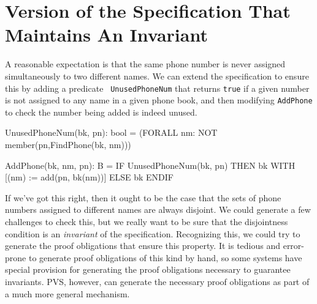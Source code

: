
\section{Version of the Specification That Maintains An Invariant}


A reasonable expectation is that the same phone number is never
assigned simultaneously to two different names.  We can extend the
specification to ensure this by adding a predicate {\tt
UnusedPhoneNum} that returns {\tt true} if a given number is not
assigned to any name in a given phone book, and  then modifying
{\tt AddPhone} to check the  number being added is indeed unused.
\begin{pvsexample}
UnusedPhoneNum(bk, pn): bool =
   (FORALL nm: NOT member(pn,FindPhone(bk, nm)))

AddPhone(bk, nm, pn): B = 
  IF UnusedPhoneNum(bk, pn) THEN bk WITH [(nm) := add(pn, bk(nm))]
    ELSE bk
  ENDIF
\end{pvsexample}

If we've got this right, then it ought to be the case that the sets of
phone numbers assigned to different names are always disjoint.  We
could generate a few challenges to check this, but we really want to
be sure that the disjointness condition is an {\em invariant\/} of the
specification.  Recognizing this, we could try to generate the proof
obligations that ensure this property.   It is tedious and
error-prone to generate proof obligations of this kind by hand, so
some systems have special provision for generating the proof
obligations necessary to guarantee invariants.  PVS, however, can
generate the necessary proof obligations as part of a much more
general mechanism.

